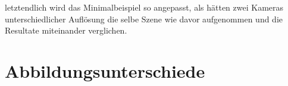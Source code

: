 letztendlich wird das Minimalbeispiel so angepasst, als hätten zwei Kameras unterschiedlicher Auflösung die selbe Szene wie davor aufgenommen und die Resultate miteinander verglichen. 

\section{Abbildungsunterschiede}

%
%
%
%
%
%
%
